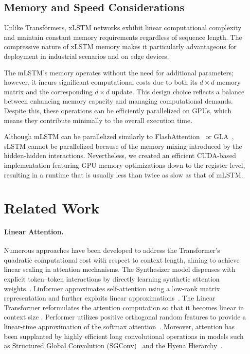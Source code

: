\subsection{Memory and Speed Considerations}

Unlike Transformers, xLSTM networks exhibit linear computational complexity and maintain constant memory requirements regardless of sequence length. The compressive nature of xLSTM memory makes it particularly advantageous for deployment in industrial scenarios and on edge devices.

The mLSTM’s memory operates without the need for additional parameters; however, it incurs significant computational costs due to both its $d \times d$ memory matrix and the corresponding $d \times d$ update. This design choice reflects a balance between enhancing memory capacity and managing computational demands. Despite this, these operations can be efficiently parallelized on GPUs, which means they contribute minimally to the overall execution time.

Although mLSTM can be parallelized similarly to FlashAttention~\citep{Dao:22,Dao:23} or GLA~\citep{Yang:23arxiv}, sLSTM cannot be parallelized because of the memory mixing introduced by the hidden-hidden interactions. Nevertheless, we created an efficient CUDA-based implementation featuring GPU memory optimizations down to the register level, resulting in a runtime that is usually less than twice as slow as that of mLSTM.

\section{Related Work}
\label{sec:related}

\paragraph{Linear Attention.} Numerous approaches have been developed to address the Transformer's quadratic computational cost with respect to context length, aiming to achieve linear scaling in attention mechanisms. The Synthesizer model dispenses with explicit token--token interactions by directly learning synthetic attention weights~\citep{Tay:20arxiv}. Linformer approximates self-attention using a low-rank matrix representation and further exploits linear approximations~\citep{Wang:20arxiv}. The Linear Transformer reformulates the attention computation so that it becomes linear in context size \citep{Katharopoulos:20}. Performer utilizes positive orthogonal random features to provide a linear-time approximation of the softmax attention~\citep{Choromanski:21}. Moreover, attention has been supplanted by highly efficient long convolutional operations in models such as Structured Global Convolution (SGConv)~\citep{Li:22} and the Hyena Hierarchy~\citep{Poli:23}.

